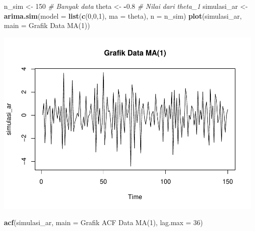 \documentclass[
]{book}
\newenvironment{Shaded}{\begin{snugshade}}{\end{snugshade}}
\newcommand{\AttributeTok}[1]{\textcolor[rgb]{0.13,0.29,0.53}{#1}}
\newcommand{\CommentTok}[1]{\textcolor[rgb]{0.56,0.35,0.01}{\textit{#1}}}
\newcommand{\DecValTok}[1]{\textcolor[rgb]{0.00,0.00,0.81}{#1}}
\newcommand{\FloatTok}[1]{\textcolor[rgb]{0.00,0.00,0.81}{#1}}
\newcommand{\FunctionTok}[1]{\textcolor[rgb]{0.13,0.29,0.53}{\textbf{#1}}}
\newcommand{\NormalTok}[1]{#1}
\newcommand{\OtherTok}[1]{\textcolor[rgb]{0.56,0.35,0.01}{#1}}
\newcommand{\SpecialCharTok}[1]{\textcolor[rgb]{0.81,0.36,0.00}{\textbf{#1}}}
\newcommand{\StringTok}[1]{\textcolor[rgb]{0.31,0.60,0.02}{#1}}
\begin{document}
\begin{Shaded}
\begin{Highlighting}[]
\NormalTok{n\_sim }\OtherTok{\textless{}{-}} \DecValTok{150} \CommentTok{\# Banyak data }
\NormalTok{theta }\OtherTok{\textless{}{-}} \SpecialCharTok{{-}}\FloatTok{0.8} \CommentTok{\# Nilai dari theta\_1}
\NormalTok{simulasi\_ar }\OtherTok{\textless{}{-}} \FunctionTok{arima.sim}\NormalTok{(}\AttributeTok{model =} \FunctionTok{list}\NormalTok{(}\FunctionTok{c}\NormalTok{(}\DecValTok{0}\NormalTok{,}\DecValTok{0}\NormalTok{,}\DecValTok{1}\NormalTok{), }\AttributeTok{ma =}\NormalTok{ theta), }
                       \AttributeTok{n =}\NormalTok{ n\_sim)}
\FunctionTok{plot}\NormalTok{(simulasi\_ar, }\AttributeTok{main =} \StringTok{\textquotesingle{}Grafik Data MA(1)\textquotesingle{}}\NormalTok{)}
\end{Highlighting}
\end{Shaded}

\begin{center}\includegraphics{_main_files/figure-latex/Model MA-1} \end{center}

\begin{Shaded}
\begin{Highlighting}[]
\FunctionTok{acf}\NormalTok{(simulasi\_ar, }\AttributeTok{main =} \StringTok{\textquotesingle{}Grafik ACF Data MA(1)\textquotesingle{}}\NormalTok{, }
  \AttributeTok{lag.max =} \DecValTok{36}\NormalTok{)}
\end{Highlighting}
\end{Shaded}
\end{document}
